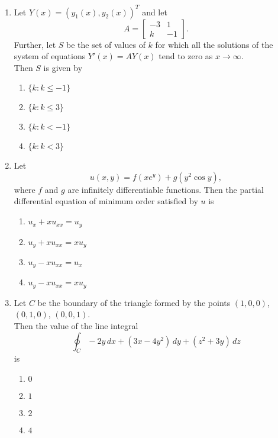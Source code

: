 \documentclass[journal]{IEEEtran}
\numberwithin{equation}{enumi}
\numberwithin{figure}{enumi}
\begin{document}
\begin{enumerate}
\item Let $Y(x) = (y_1(x), y_2(x))^T$ and let
\[
A = \begin{bmatrix} -3 & 1 \\ k & -1 \end{bmatrix}.
\]
Further, let $S$ be the set of values of $k$ for which all the solutions of the system of equations $Y'(x) = A Y(x)$ tend to zero as $x \rightarrow \infty$. 
\\Then $S$ is given by      \hfill{}
\begin{multicols}{2}
    \begin{enumerate}
        \item $\{k : k \leq -1\}$
        \item $\{k : k \leq 3\}$
        \item $\{k : k < -1\}$
        \item  $\{k : k < 3\}$
    \end{enumerate}
    \end{multicols}


\item Let
\[
u(x,y) = f(xe^y) + g(y^2 \cos y),
\]
where $f$ and $g$ are infinitely differentiable functions. Then the partial differential equation of minimum order satisfied by $u$ is 
\hfill{}
\begin{multicols}{2}
    \begin{enumerate}
        \item  $u_x + x u_{xx} = u_y$
        \item  $u_y + x u_{xx} = x u_y$
        \item  $u_y - x u_{xx} = u_x$ 
        \item  $u_y - x u_{xx} = x u_y$
    \end{enumerate}
    \end{multicols}


\item Let $C$ be the boundary of the triangle formed by the points $(1,0,0)$, $(0,1,0)$, $(0,0,1)$.\\
Then the value of the line integral    \hfill{}
\[
\oint_C -2y\,dx + (3x - 4y^2)\,dy + (z^2 + 3y)\,dz
\]
is
\begin{multicols}{4}
\begin{enumerate}
    \item $0$
    \item $1$
    \item $2$
    \item $4$
\end{enumerate}
\end{multicols}



\end{enumerate}
\end{document}
